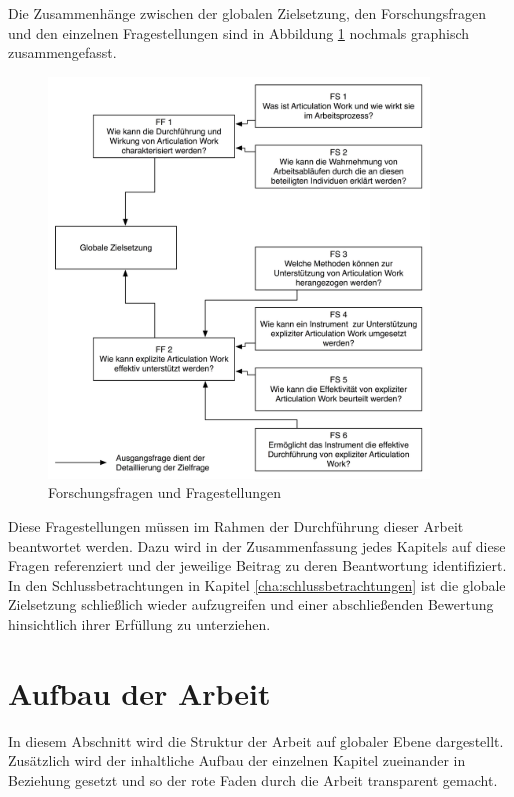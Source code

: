 Die Zusammenhänge zwischen der globalen Zielsetzung, den Forschungsfragen und den einzelnen Fragestellungen sind in Abbildung \ref{fig:img_Einfuehrung_zielhierarchie} nochmals graphisch zusammengefasst. 

\begin{figure}[htbp]
	\centering
		\includegraphics[width=0.9\textwidth]{img/Einfuehrung/zielhierarchie.png}
	\caption{Forschungsfragen und Fragestellungen}
	\label{fig:img_Einfuehrung_zielhierarchie}
\end{figure}

Diese Fragestellungen müssen im Rahmen der Durchführung dieser Arbeit beantwortet werden. Dazu wird in der Zusammenfassung jedes Kapitels auf diese Fragen referenziert und der jeweilige Beitrag zu deren Beantwortung identifiziert. In den Schlussbetrachtungen in Kapitel \ref{cha:schlussbetrachtungen} ist die globale Zielsetzung schließlich wieder aufzugreifen und einer abschließenden Bewertung hinsichtlich ihrer Erfüllung zu unterziehen. 


\section{Aufbau der Arbeit} %
\label{sec:aufbau_der_arbeit}

In diesem Abschnitt wird die Struktur der Arbeit auf globaler Ebene dargestellt. Zusätzlich wird der inhaltliche Aufbau der einzelnen Kapitel zueinander in Beziehung gesetzt und so der rote Faden durch die Arbeit transparent gemacht.

